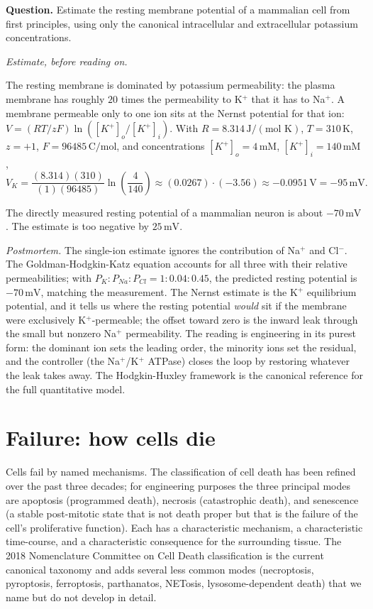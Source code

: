 \begin{estimation}
\textbf{Question.} Estimate the resting membrane potential of a
mammalian cell from first principles, using only the canonical
intracellular and extracellular potassium concentrations.

\smallskip
\textit{Estimate, before reading on.}

\smallskip
The resting membrane is dominated by potassium permeability: the
plasma membrane has roughly $20$ times the permeability to K$^+$
that it has to Na$^+$. A membrane permeable only to one ion sits at
the Nernst potential for that ion: $V = (RT/zF) \ln([K^+]_o /
[K^+]_i)$. With $R = 8.314\,\text{J}/(\text{mol K})$, $T = 310\,\text{K}$,
$z = +1$, $F = 96485\,\text{C}/\text{mol}$, and concentrations
$[K^+]_o = 4\,\text{mM}$, $[K^+]_i = 140\,\text{mM}$,
\[
V_K = \frac{(8.314)(310)}{(1)(96485)} \ln\left(\frac{4}{140}\right)
\approx (0.0267) \cdot (-3.56)
\approx -0.0951\,\text{V} = -95\,\text{mV}.
\]

The directly measured resting potential of a mammalian neuron is
about $-70\,\text{mV}$. The estimate is too negative by $25\,\text{mV}$.

\smallskip
\textit{Postmortem.} The single-ion estimate ignores the contribution
of Na$^+$ and Cl$^-$. The Goldman-Hodgkin-Katz equation accounts for
all three with their relative permeabilities; with $P_K : P_{Na} :
P_{Cl} = 1 : 0.04 : 0.45$, the predicted resting potential is
$-70\,\text{mV}$, matching the measurement. The Nernst estimate is
the K$^+$ equilibrium potential, and it tells us where the resting
potential \emph{would} sit if the membrane were exclusively
K$^+$-permeable; the offset toward zero is the inward leak through
the small but nonzero Na$^+$ permeability. The reading is engineering
in its purest form: the dominant ion sets the leading order, the
minority ions set the residual, and the controller (the Na$^+$/K$^+$
ATPase) closes the loop by restoring whatever the leak takes away.
The Hodgkin-Huxley framework
\cite{paper:v6c01-hodgkin-huxley-1952,text:v6c01-hille-channels-2001}
is the canonical reference for the full quantitative model.
\end{estimation}

\section{Failure: how cells die}

Cells fail by named mechanisms. The classification of cell death has
been refined over the past three decades; for engineering purposes the
three principal modes are apoptosis (programmed death), necrosis
(catastrophic death), and senescence (a stable post-mitotic state
that is not death proper but that is the failure of the cell's
proliferative function). Each has a characteristic mechanism, a
characteristic time-course, and a characteristic consequence for the
surrounding tissue. The 2018 Nomenclature Committee on Cell Death
classification \cite{paper:v6c01-galluzzi-2018} is the current
canonical taxonomy and adds several less common modes (necroptosis,
pyroptosis, ferroptosis, parthanatos, NETosis, lysosome-dependent
death) that we name but do not develop in detail.

